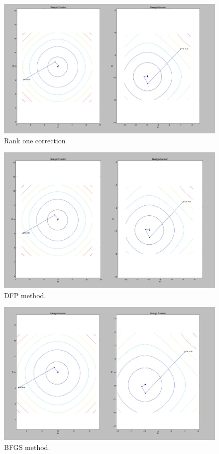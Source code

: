 \documentclass{article}
\begin{document}
\begin{figure}[h]
\includegraphics[width=\textwidth]{image/rankone_method}
\centering
\caption{Rank one correction}
\end{figure} 

\begin{figure}[h]
\includegraphics[width=\textwidth]{image/DFP_method}
\centering
\caption{DFP method.   } 
\end{figure} 

\begin{figure}[h]
\includegraphics[width=\textwidth]{image/BFGS_method}
\centering
\caption{BFGS method. }
\end{figure} 
\end{document}
